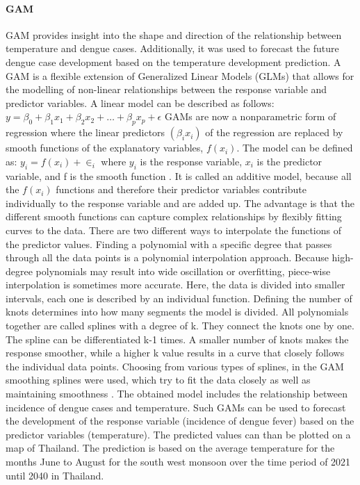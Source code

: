 	\paragraph{GAM}
	GAM provides insight into the shape and direction of the relationship between temperature and dengue cases. Additionally, it was used to forecast the future dengue case development based on the temperature development prediction. 
	A GAM is a flexible extension of Generalized Linear Models (GLMs) that allows for the modelling of non-linear relationships between the response variable and predictor variables. A linear model can be described as follows:
	$y=\beta _0+\beta _1 x_1+\beta _2 x_2 +…+\beta _p x_p+\epsilon$
	GAMs are now a nonparametric form of regression where the linear predictors $(\beta_i x_i)$ of the regression are replaced by smooth functions of the explanatory variables, $f(x_i)$. The model can be defined as:
	$y_i=f(x_i )+\in_i$
	where $y_i$ is the response variable, $x_i$ is the predictor variable, and f is the smooth function \citep{Wood2006}.
	It is called an additive model, because all the $f(x_i)$ functions and therefore their predictor variables contribute individually to the response variable and are added up. The advantage is that the different smooth functions can capture complex relationships by flexibly fitting curves to the data.
	There are two different ways to interpolate the functions of the predictor values. Finding a polynomial with a specific degree that passes through all the data points is a polynomial interpolation approach. Because high-degree polynomials may result into wide oscillation or overfitting, piece-wise interpolation is sometimes more accurate. Here, the data is divided into smaller intervals, each one is described by an individual function. Defining the number of knots determines into how many segments the model is divided. All polynomials together are called splines with a degree of k. They connect the knots one by one. The spline can be differentiated k-1 times. A smaller number of knots makes the response smoother, while a higher k value results in a curve that closely follows the individual data points. Choosing from various types of splines, in the GAM smoothing splines were used, which try to fit the data closely as well as maintaining smoothness \citep{Peri2021}.
	The obtained model includes the relationship between incidence of dengue cases and temperature. Such GAMs can be used to forecast the development of the response variable (incidence of dengue fever) based on the predictor variables (temperature). The predicted values can than be plotted on a map of Thailand. The prediction is based on the average temperature for the months June to August for the south west monsoon over the time period of 2021 until 2040 in Thailand.
	
